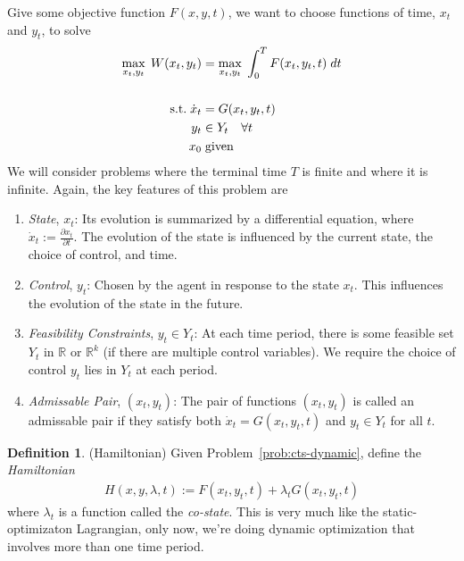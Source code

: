 \documentclass[12pt]{article}
\numberwithin{equation}{section} %
\theoremstyle{plain}
\theoremstyle{definition}
\newtheorem{defn}[thm]{Definition}
\theoremstyle{remark}
\newcommand{\R}{\mathbb{R}}
\newcommand{\Rn}{\mathbb{R}^n}
\newcommand{\Rk}{\mathbb{R}^k}
\begin{document}
Give some objective function $F(x,y,t)$, we want to choose functions
of time, $x_t$ and $y_t$, to solve
\begin{align}
  \max_{x_t,y_t} \; W(x_t,y_t) &=
  \max_{x_t,y_t} \; \int^{T}_{0} F(x_t,y_t,t) \; dt
  \label{prob:cts-dynamic} \\\notag\\
  \text{s.t.} \;
   \dot{x}_t &= G(x_t,y_t,t) \notag \\
   y_t &\in Y_t \quad \forall t\notag \\
   x_0  &\;\text{given} \notag
\end{align}
We will consider problems where the terminal time $T$ is finite and
where it is infinite.
Again, the key features of this problem are
\begin{enumerate}
  \item \emph{State}, $x_t$:
    Its evolution is summarized by a differential equation, where
    $\dot{x}_t := \frac{\partial x_t}{\partial t}$. The evolution of the
    state is influenced by the current state, the choice of control, and
    time.
  \item \emph{Control}, $y_t$: Chosen by the agent in response to the
    state $x_t$. This influences the evolution of the state in the
    future.
  \item \emph{Feasibility Constraints}, $y_t\in Y_t$: At each time
    period, there is some feasible set $Y_t$ in $\R$ or $\Rk$ (if there
    are multiple control variables). We require the choice of control
    $y_t$ lies in $Y_t$ at each period.
  \item \emph{Admissable Pair}, $(x_t,y_t)$: The pair of functions
    $(x_t,y_t)$ is called an admissable pair if they satisfy both
    $\dot{x}_t = G(x_t,y_t,t)$ and $y_t\in Y_t$ for all $t$.
\end{enumerate}

\begin{defn}{(Hamiltonian)}
Given Problem~\ref{prob:cts-dynamic}, define the \emph{Hamiltonian}
\begin{align*}
  H(x,y,\lambda,t) := F(x_t,y_t,t) + \lambda_t G(x_t,y_t,t)
\end{align*}
where $\lambda_t$ is a function called the \emph{co-state}.
This is very much like the static-optimizaton Lagrangian, only now,
we're doing dynamic optimization that involves more than one time
period.
\end{defn}
\end{document}
